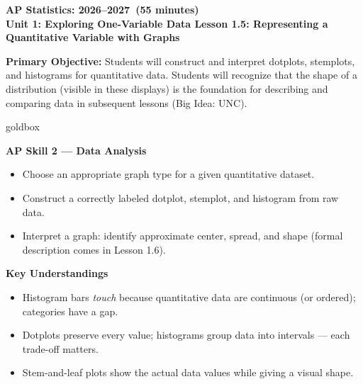 \documentclass[10pt]{article}
\begin{document}
\def\CourseName{AP Statistics}
\def\SchoolYear{2026--2027}
\def\MeetingLength{55 minutes}
\def\UnitNumberName{Unit 1: Exploring One-Variable Data \quad}
\def\LessonNumberName{Lesson 1.5: Representing a Quantitative Variable with Graphs}

\begin{center}
    {\Large\bfseries \CourseName: \SchoolYear\ (\MeetingLength) \\
    {\small\bfseries \UnitNumberName \LessonNumberName}}
\end{center}

\begin{tcolorbox}[colback=sky,colframe=navy,boxrule=0.9pt,arc=2mm,
    left=2mm,right=2mm,top=1.5mm,bottom=1.5mm]
    \textbf{Primary Objective:} Students will construct and interpret dotplots, stemplots, and
    histograms for quantitative data. Students will recognize that the shape of a distribution
    (visible in these displays) is the foundation for describing and comparing data in subsequent
    lessons (Big Idea: UNC).
\end{tcolorbox}

\begin{skillbox}{goldbox}
\begin{minipage}[t]{0.48\linewidth}
    \textbf{AP Skill 2 --- Data Analysis}
    \begin{itemize}
        \item Choose an appropriate graph type for a given quantitative dataset.
        \item Construct a correctly labeled dotplot, stemplot, and histogram from raw data.
        \item Interpret a graph: identify approximate center, spread, and shape (formal description comes in Lesson 1.6).
    \end{itemize}
\end{minipage}
\hfill
\begin{minipage}[t]{0.48\linewidth}
    \textbf{Key Understandings}
    \begin{itemize}
        \item Histogram bars \textit{touch} because quantitative data are continuous (or ordered); categories have a gap.
        \item Dotplots preserve every value; histograms group data into intervals --- each trade-off matters.
        \item Stem-and-leaf plots show the actual data values while giving a visual shape.
    \end{itemize}
\end{minipage}
\end{skillbox}
\end{document}
